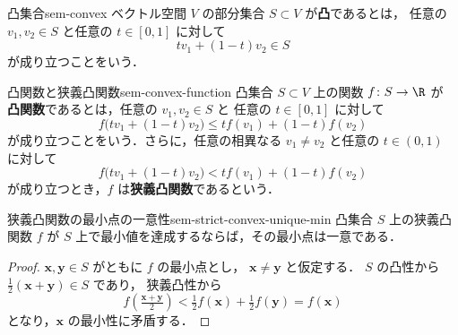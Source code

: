 \begin{definition}{凸集合}{sem-convex}
  ベクトル空間 $V$ の部分集合 $S \subset V$ が\textbf{凸}であるとは，
  任意の $v_1, v_2 \in S$ と任意の $t \in [0,1]$ に対して
  \[
    t v_1 + (1-t) v_2 \in S
  \]
  が成り立つことをいう．
\end{definition}

\begin{definition}{凸関数と狭義凸関数}{sem-convex-function}
  凸集合 $S \subset V$ 上の関数 $f \colon S \to \R$ が
  \textbf{凸関数}であるとは，任意の $v_1, v_2 \in S$ と
  任意の $t \in [0,1]$ に対して
  \[
    f\bigl(t v_1 + (1-t)v_2\bigr)
    \leq
    t f(v_1) + (1-t) f(v_2)
  \]
  が成り立つことをいう．さらに，任意の相異なる
  $v_1 \neq v_2$ と任意の $t \in (0,1)$ に対して
  \[
    f\bigl(t v_1 + (1-t)v_2\bigr)
    <
    t f(v_1) + (1-t) f(v_2)
  \]
  が成り立つとき，$f$ は\textbf{狭義凸関数}であるという．
\end{definition}

\begin{proposition}{狭義凸関数の最小点の一意性}{sem-strict-convex-unique-min}
  凸集合 $S$ 上の狭義凸関数 $f$ が
  $S$ 上で最小値を達成するならば，その最小点は一意である．
\end{proposition}

\begin{proof}
  $\mathbf{x}, \mathbf{y} \in S$ がともに $f$ の最小点とし，
  $\mathbf{x} \neq \mathbf{y}$ と仮定する．
  $S$ の凸性から
  $\tfrac{1}{2}(\mathbf{x}+\mathbf{y}) \in S$ であり，
  狭義凸性から
  \[
    f\!\left(\tfrac{\mathbf{x}+\mathbf{y}}{2}\right)
    < \tfrac{1}{2}f(\mathbf{x}) + \tfrac{1}{2}f(\mathbf{y})
    = f(\mathbf{x})
  \]
  となり，$\mathbf{x}$ の最小性に矛盾する．
\end{proof}
